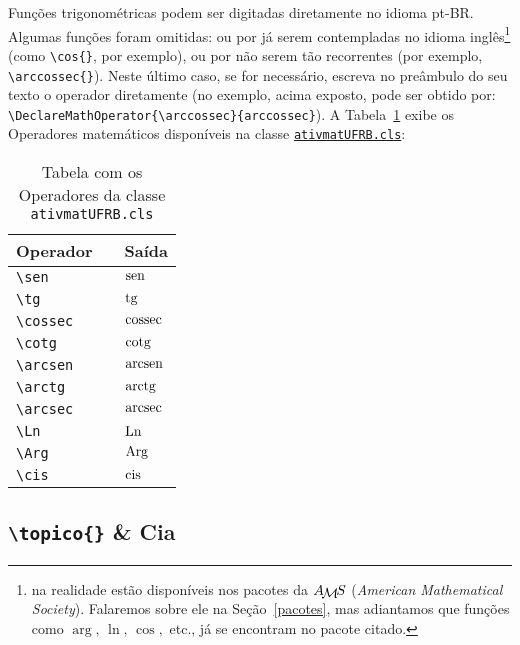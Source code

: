 Funções trigonométricas podem ser digitadas diretamente no idioma pt-BR.
Algumas funções foram omitidas: ou por já serem contempladas no idioma 
inglês\footnote{na realidade estão disponíveis nos pacotes da $\AmS$ 
(\textit{American Mathematical Society}).
Falaremos sobre ele na Seção~\ref{pacotes}, mas adiantamos que funções como
$\arg,\, \ln,\, \cos,$ etc., já se encontram no pacote citado.} (como 
\verb|\cos{}|, por exemplo), ou por não serem tão recorrentes (por exemplo,
\verb|\arccossec{}|).
Neste último caso, se for necessário, escreva no preâmbulo do seu texto o 
operador diretamente (no exemplo, acima exposto, pode ser obtido por:
\verb|\DeclareMathOperator{\arccossec}{arccossec}|).
A Tabela~\ref{tab:op} exibe os Operadores matemáticos disponíveis na classe
\href{https://ctan.dcc.uchile.cl/macros/latex/base/classes.pdf}{\texttt{ativmatUFRB.cls}}:

\begin{table}[!htbp]
 \centering
 \caption{Tabela com os Operadores da classe \texttt{ativmatUFRB.cls}}
 \label{tab:op}
 \begin{tabular}{lcl}
  \toprule
   \textbf{Operador} && \textbf{Saída}\\
  \midrule
   \verb|\sen|       && $\operatorname{sen}{}$\\
   \verb|\tg|        && $\operatorname{tg}$\\
   \verb|\cossec|    && $\operatorname{cossec}$\\
   \verb|\cotg|      && $\operatorname{cotg}$\\
   \verb|\arcsen|    && $\operatorname{arcsen}$\\
   \verb|\arctg|     && $\operatorname{arctg}$\\
   \verb|\arcsec|    && $\operatorname{arcsec}$\\
   \verb|\Ln|        && $\operatorname{Ln}$\\
   \verb|\Arg|       && $\operatorname{Arg}$\\
   \verb|\cis|       && $\operatorname{cis}$\\
  \bottomrule
\end{tabular}
\end{table}

\subsection{\texttt{\textbackslash topico\{\}} \& Cia}

